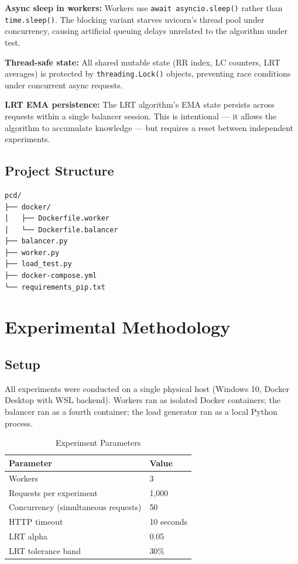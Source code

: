 \documentclass[conference]{IEEEtran}
\begin{document}
\textbf{Async sleep in workers:} Workers use \texttt{await asyncio.sleep()} rather than \texttt{time.sleep()}. The blocking variant starves uvicorn's thread pool under concurrency, causing artificial queuing delays unrelated to the algorithm under test.

\textbf{Thread-safe state:} All shared mutable state (RR index, LC counters, LRT averages) is protected by \texttt{threading.Lock()} objects, preventing race conditions under concurrent async requests.

\textbf{LRT EMA persistence:} The LRT algorithm's EMA state persists across requests within a single balancer session. This is intentional --- it allows the algorithm to accumulate knowledge --- but requires a reset between independent experiments.

\subsection{Project Structure}

\begin{verbatim}
pcd/
├── docker/
│   ├── Dockerfile.worker
│   └── Dockerfile.balancer
├── balancer.py
├── worker.py
├── load_test.py
├── docker-compose.yml
└── requirements_pip.txt
\end{verbatim}

\section{Experimental Methodology}

\subsection{Setup}

All experiments were conducted on a single physical host (Windows 10, Docker Desktop with WSL backend). Workers ran as isolated Docker containers; the balancer ran as a fourth container; the load generator ran as a local Python process.

\begin{table}[h]
  \centering
  \caption{Experiment Parameters}
  \begin{tabular}{ll}
    \toprule
    \textbf{Parameter} & \textbf{Value} \\
    \midrule
    Workers & 3 \\
    Requests per experiment & 1,000 \\
    Concurrency (simultaneous requests) & 50 \\
    HTTP timeout & 10 seconds \\
    LRT alpha & 0.05 \\
    LRT tolerance band & 30\% \\
    \bottomrule
  \end{tabular}
\end{table}
\end{document}
